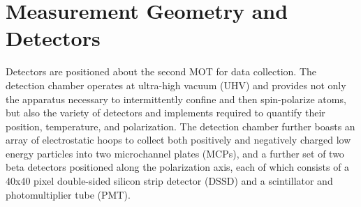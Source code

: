 \section{Measurement Geometry and Detectors}
\label{section:betadetectors}



Detectors are positioned about the second MOT for data collection.  The detection chamber 
operates at ultra-high vacuum (UHV) and provides not only the apparatus necessary to intermittently confine and then spin-polarize atoms, but also the variety of detectors and implements required to quantify their position, temperature, and polarization.  The detection chamber further boasts an array of electrostatic hoops to collect both positively and negatively charged low energy particles into two microchannel plates (MCPs),  and a further set of two beta detectors positioned along the polarization axis, each of which consists of a 40x40 pixel double-sided silicon strip detector (DSSD) and a scintillator and photomultiplier tube (PMT).  %




